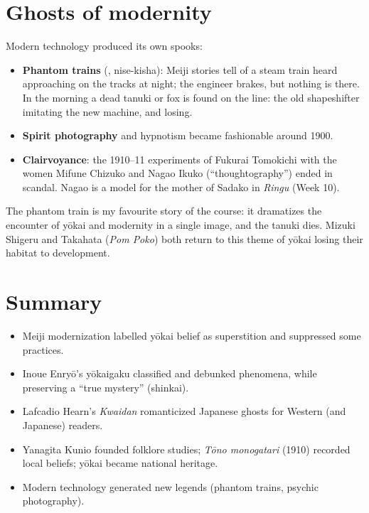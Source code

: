\section{Ghosts of modernity}

Modern technology produced its own spooks:

\begin{itemize}
  \item \textbf{Phantom trains} (, nise-kisha): Meiji stories tell of a
        steam train heard approaching on the tracks at night; the engineer brakes, but
        nothing is there. In the morning a dead tanuki or fox is found on the line: the old
        shapeshifter imitating the new machine, and losing.
  \item \textbf{Spirit photography} and hypnotism became fashionable around 1900.
  \item \textbf{Clairvoyance}: the 1910--11 experiments of Fukurai Tomokichi with the women
        Mifune Chizuko and Nagao Ikuko (``thoughtography'') ended in scandal. Nagao is a
        model for the mother of Sadako in \emph{Ringu} (Week 10).
\end{itemize}

\begin{aside}
The phantom train is my favourite story of the course: it dramatizes the encounter of
yōkai and modernity in a single image, and the tanuki dies. Mizuki Shigeru and Takahata
(\emph{Pom Poko}) both return to this theme of yōkai losing their habitat to development.
\end{aside}

\section*{Summary}
\begin{itemize}
  \item Meiji modernization labelled yōkai belief as superstition and suppressed some
        practices.
  \item Inoue Enryō's yōkaigaku classified and debunked phenomena, while preserving a
        ``true mystery'' (shinkai).
  \item Lafcadio Hearn's \emph{Kwaidan} romanticized Japanese ghosts for Western (and
        Japanese) readers.
  \item Yanagita Kunio founded folklore studies; \emph{Tōno monogatari} (1910) recorded
        local beliefs; yōkai became national heritage.
  \item Modern technology generated new legends (phantom trains, psychic photography).
\end{itemize}
